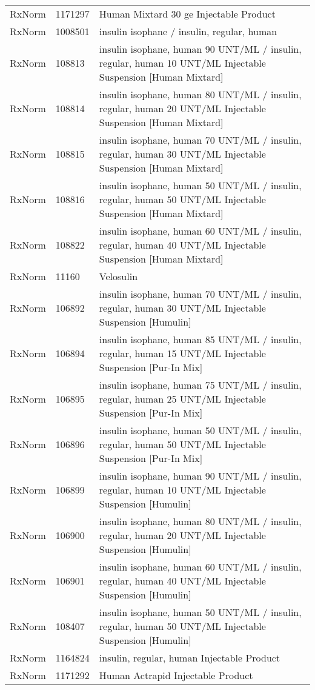 \begin{longtable}{p{}p{}p{}}
  RxNorm & 1171297 & Human Mixtard 30 ge Injectable Product \\ 
  RxNorm & 1008501 & insulin isophane / insulin, regular, human \\ 
  RxNorm & 108813 & insulin isophane, human 90 UNT/ML / insulin, regular, human 10 UNT/ML Injectable Suspension [Human Mixtard] \\ 
  RxNorm & 108814 & insulin isophane, human 80 UNT/ML / insulin, regular, human 20 UNT/ML Injectable Suspension [Human Mixtard] \\ 
  RxNorm & 108815 & insulin isophane, human 70 UNT/ML / insulin, regular, human 30 UNT/ML Injectable Suspension [Human Mixtard] \\ 
  RxNorm & 108816 & insulin isophane, human 50 UNT/ML / insulin, regular, human 50 UNT/ML Injectable Suspension [Human Mixtard] \\ 
  RxNorm & 108822 & insulin isophane, human 60 UNT/ML / insulin, regular, human 40 UNT/ML Injectable Suspension [Human Mixtard] \\ 
  RxNorm & 11160 & Velosulin \\ 
  RxNorm & 106892 & insulin isophane, human 70 UNT/ML / insulin, regular, human 30 UNT/ML Injectable Suspension [Humulin] \\ 
  RxNorm & 106894 & insulin isophane, human 85 UNT/ML / insulin, regular, human 15 UNT/ML Injectable Suspension [Pur-In Mix] \\ 
  RxNorm & 106895 & insulin isophane, human 75 UNT/ML / insulin, regular, human 25 UNT/ML Injectable Suspension [Pur-In Mix] \\ 
  RxNorm & 106896 & insulin isophane, human 50 UNT/ML / insulin, regular, human 50 UNT/ML Injectable Suspension [Pur-In Mix] \\ 
  RxNorm & 106899 & insulin isophane, human 90 UNT/ML / insulin, regular, human 10 UNT/ML Injectable Suspension [Humulin] \\ 
  RxNorm & 106900 & insulin isophane, human 80 UNT/ML / insulin, regular, human 20 UNT/ML Injectable Suspension [Humulin] \\ 
  RxNorm & 106901 & insulin isophane, human 60 UNT/ML / insulin, regular, human 40 UNT/ML Injectable Suspension [Humulin] \\ 
  RxNorm & 108407 & insulin isophane, human 50 UNT/ML / insulin, regular, human 50 UNT/ML Injectable Suspension [Humulin] \\ 
  RxNorm & 1164824 & insulin, regular, human Injectable Product \\ 
  RxNorm & 1171292 & Human Actrapid Injectable Product \\ 

\end{longtable}
